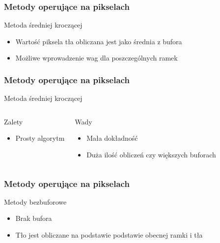 \documentclass{beamer}
\begin{document}
\begin{frame}
\frametitle{Metody operujące na pikselach}
\begin{block}{Metoda średniej kroczącej}
\begin{itemize}
\item Wartość piksela tła obliczana jest jako średnia z bufora
\item Możliwe wprowadzenie wag dla poszczególnych ramek
\end{itemize}
\end{block}


\end{frame}

\begin{frame}
\frametitle{Metody operujące na pikselach}
\begin{block}{Metoda średniej kroczącej}
\begin{columns}
\begin{block}{Zalety}
\begin{itemize}
\item Prosty algorytm
\end{itemize}
\end{block}
\begin{block}{Wady}
\begin{itemize}
\item Mała dokładność
\item Duża ilość obliczeń czy większych buforach
\end{itemize}
\end{block}
\end{columns}
\end{block}




\end{frame}











\begin{frame}
\frametitle{Metody operujące na pikselach}
\begin{block}{Metody bezbuforowe}
\begin{itemize}
\item Brak bufora
\item Tło jest obliczane na podstawie podstawie obecnej ramki i tła
\end{itemize}
\end{block}


\end{frame}
\end{document}

